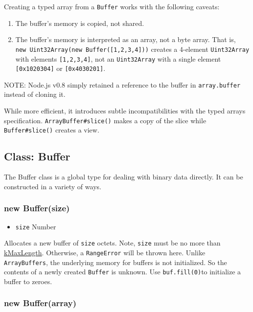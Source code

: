 Creating a typed array from a \texttt{Buffer} works with the following
caveats:

\begin{enumerate}
\def\labelenumi{\arabic{enumi}.}
\item
  The buffer's memory is copied, not shared.
\item
  The buffer's memory is interpreted as an array, not a byte array. That
  is, \texttt{new\ Uint32Array(new\ Buffer({[}1,2,3,4{]}))} creates a
  4-element \texttt{Uint32Array} with elements \texttt{{[}1,2,3,4{]}},
  not an \texttt{Uint32Array} with a single element
  \texttt{{[}0x1020304{]}} or \texttt{{[}0x4030201{]}}.
\end{enumerate}

NOTE: Node.js v0.8 simply retained a reference to the buffer in
\texttt{array.buffer} instead of cloning it.

While more efficient, it introduces subtle incompatibilities with the
typed arrays specification. \texttt{ArrayBuffer\#slice()} makes a copy
of the slice while \texttt{Buffer\#slice()} creates a view.

\subsection{Class: Buffer}\label{class-buffer}

The Buffer class is a global type for dealing with binary data directly.
It can be constructed in a variety of ways.

\subsubsection{new Buffer(size)}\label{new-buffersize}

\begin{itemize}
\itemsep1pt\parskip0pt
\item
  \texttt{size} Number
\end{itemize}

Allocates a new buffer of \texttt{size} octets. Note, \texttt{size} must
be no more than
\href{smalloc.html\#smalloc_smalloc_kmaxlength}{kMaxLength}. Otherwise,
a \texttt{RangeError} will be thrown here. Unlike \texttt{ArrayBuffers},
the underlying memory for buffers is not initialized. So the contents of
a newly created \texttt{Buffer} is unknown. Use \texttt{buf.fill(0)}to
initialize a buffer to zeroes.

\subsubsection{new Buffer(array)}\label{new-bufferarray}

